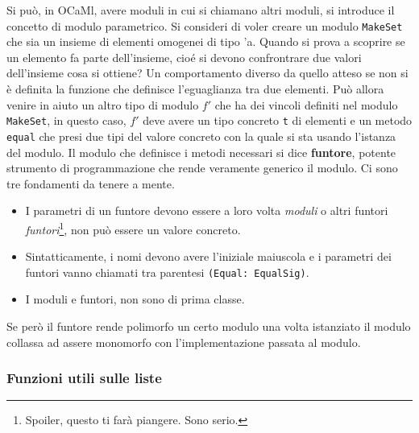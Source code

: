 \documentclass{article}
\begin{document}
\vspace*{0.5cm}

\hspace*{0.5cm}Si può, in OCaMl, avere moduli in cui si chiamano altri moduli, si introduce il concetto di modulo parametrico.
Si consideri di voler creare un modulo \texttt{MakeSet} che sia un insieme di elementi omogenei di tipo 'a.
Quando si prova a scoprire se un elemento fa parte dell'insieme, cioé si devono confrontrare due valori dell'insieme cosa si ottiene? 
Un comportamento diverso da quello atteso se non si è definita la funzione che definisce l'eguaglianza tra due elementi.
Può allora venire in aiuto un altro tipo di modulo $f'$ che ha dei vincoli definiti nel modulo \texttt{MakeSet}, in questo caso, $f'$ deve avere un tipo concreto \texttt{t} di elementi e un metodo \texttt{equal} che presi due tipi del valore concreto con la quale si sta usando l'istanza del modulo.\newline
\hspace*{0.5cm}Il modulo che definisce i metodi necessari si dice \textbf{funtore}, potente strumento di programmazione che rende veramente generico il modulo.
Ci sono tre fondamenti da tenere a mente.

\begin{itemize}
  \item I parametri di un funtore devono essere a loro volta \textit{moduli} o altri funtori \textit{funtori}\footnote{Spoiler, questo ti farà piangere. Sono serio.}, non può essere un valore concreto.
  \item Sintatticamente, i nomi devono avere l'iniziale maiuscola e i parametri dei funtori vanno chiamati tra parentesi \texttt{(Equal: EqualSig)}.
  \item I moduli e funtori, non sono di prima classe.
\end{itemize}

\vspace*{0.5cm}

\hspace*{0.5cm}Se però il funtore rende polimorfo un certo modulo una volta istanziato il modulo collassa ad assere monomorfo con l'implementazione passata al modulo.

\subsubsection{Funzioni utili sulle liste}

\vspace*{0.5cm}
\end{document}
